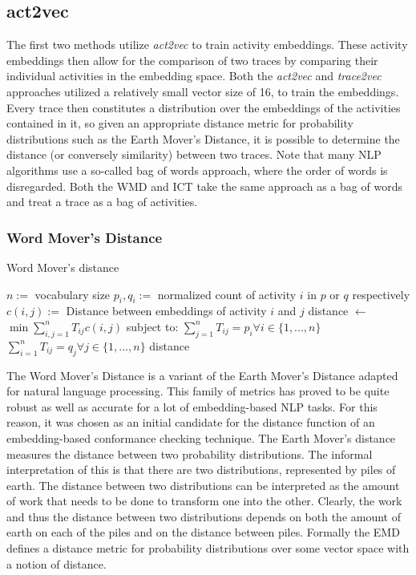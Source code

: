 \documentclass[runningheads]{template/llncs}
\begin{document}
\subsection{act2vec}
The first two methods utilize \emph{act2vec} to train activity embeddings.
These activity embeddings then allow for the comparison of two traces by comparing their individual activities in the embedding space.
Both the \emph{act2vec} and \emph{trace2vec} approaches utilized a relatively small vector size of 16, to train the embeddings.
Every trace then constitutes a distribution over the embeddings of the activities contained in it, so given an appropriate distance metric for probability distributions such as the Earth Mover's Distance, it is possible to determine the distance (or conversely similarity) between two traces.
Note that many NLP algorithms use a so-called bag of words approach, where the order of words is disregarded.
Both the WMD and ICT take the same approach as a bag of words and treat a trace as a bag of activities.

\subsubsection{Word Mover's Distance}


\begin{algorithm}
	\caption{Word Mover's distance}\label{alg:wmd}
	\begin{algorithmic}
		\State $n:=$ vocabulary size
		\State $p_i,q_i := $ normalized count of activity $i$ in $p$ or $q$ respectively
		\State $c(i,j) :=$ Distance between embeddings of activity $i$ and $j$
		\State distance $\gets$ $\min \sum_{i,j=1}^n T_{ij}c(i,j)$
		\State subject to:
		\State $\sum_{j=1}^{n}T_{ij}=p_i \forall i \in \{1,...,n\}$ 
		\State $\sum_{i=1}^{n}T_{ij}=q_j \forall j \in \{1,...,n\}$ 
		\State \Return distance
		\EndFunction
	\end{algorithmic}
\end{algorithm}
The Word Mover's Distance \cite{KSKW15} is a variant of the Earth Mover's Distance \cite{RTGu98} adapted for natural language processing.
This family of metrics has proved to be quite robust as well as accurate for a lot of embedding-based NLP tasks.
For this reason, it was chosen as an initial candidate for the distance function of an embedding-based conformance checking technique.
The Earth Mover's distance measures the distance between two probability distributions.
The informal interpretation of this is that there are two distributions, represented by piles of earth.
The distance between two distributions can be interpreted as the amount of work that needs to be done to transform one into the other.
Clearly, the work and thus the distance between two distributions depends on both the amount of earth on each of the piles and on the distance between piles.
Formally the EMD defines a distance metric for probability distributions over some vector space with a notion of distance.
\end{document}

